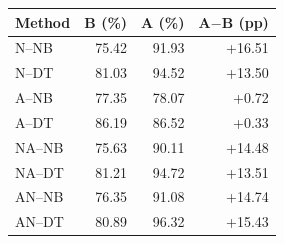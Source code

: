 \begin{tabular}{lrrr}
\toprule
Method & B (\%) & A (\%) & A$-$B (pp) \\
\midrule
N--NB & 75.42 & 91.93 & +16.51 \\
N--DT & 81.03 & 94.52 & +13.50 \\
A--NB & 77.35 & 78.07 & +0.72 \\
A--DT & 86.19 & 86.52 & +0.33 \\
NA--NB & 75.63 & 90.11 & +14.48 \\
NA--DT & 81.21 & 94.72 & +13.51 \\
AN--NB & 76.35 & 91.08 & +14.74 \\
AN--DT & 80.89 & 96.32 & +15.43 \\
\bottomrule
\end{tabular}
